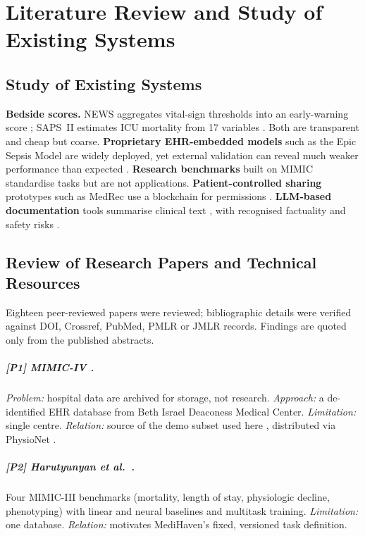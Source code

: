 \chapter{Literature Review and Study of Existing Systems}
\label{ch:lit}

\section{Study of Existing Systems}
\textbf{Bedside scores.} NEWS aggregates vital-sign thresholds into an early-warning score
\cite{smith2013news}; SAPS~II estimates ICU mortality from 17 variables \cite{legall1993sapsii}. Both are
transparent and cheap but coarse. \textbf{Proprietary EHR-embedded models} such as the Epic Sepsis Model
are widely deployed, yet external validation can reveal much weaker performance than expected
\cite{wong2021epicsepsis}. \textbf{Research benchmarks} built on MIMIC
\cite{harutyunyan2019multitask,purushotham2018benchmarking} standardise tasks but are not applications.
\textbf{Patient-controlled sharing} prototypes such as MedRec use a blockchain for permissions
\cite{azaria2016medrec}. \textbf{LLM-based documentation} tools summarise clinical text
\cite{vanveen2024adapted}, with recognised factuality and safety risks \cite{singhal2023llmclinical}.

\section{Review of Research Papers and Technical Resources}
Eighteen peer-reviewed papers were reviewed; bibliographic details were verified against DOI, Crossref,
PubMed, PMLR or JMLR records. Findings are quoted only from the published abstracts.

\paragraph{[P1] MIMIC-IV \cite{johnson2023mimiciv}.} \emph{Problem:} hospital data are archived for
storage, not research. \emph{Approach:} a de-identified EHR database from Beth Israel Deaconess Medical
Center. \emph{Limitation:} single centre. \emph{Relation:} source of the demo subset used here
\cite{johnson2023mimicivdemo}, distributed via PhysioNet \cite{goldberger2000physionet}.

\paragraph{[P2] Harutyunyan et al.\ \cite{harutyunyan2019multitask}.} Four MIMIC-III benchmarks
(mortality, length of stay, physiologic decline, phenotyping) with linear and neural baselines and multitask
training. \emph{Limitation:} one database. \emph{Relation:} motivates MediHaven's fixed, versioned task
definition.

